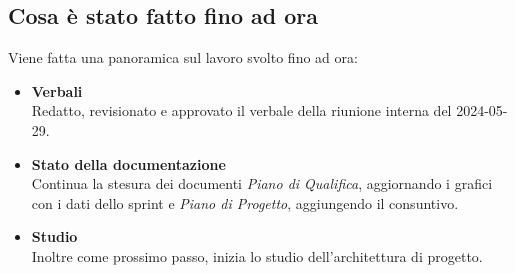 \documentclass[italian,12pt]{article}
\begin{document}
\subsection{Cosa è stato fatto fino ad ora}
Viene fatta una panoramica sul lavoro svolto fino ad ora:
\begin{itemize}
	\item \textbf{Verbali} \\
		  Redatto, revisionato e approvato il verbale della riunione interna del 2024-05-29.
	\item \textbf{Stato della documentazione} \\
		  Continua la stesura dei documenti \textit{Piano di Qualifica}, aggiornando i grafici con i dati dello sprint e \textit{Piano di Progetto}, aggiungendo il consuntivo.
	\item \textbf{Studio} \\
		  Inoltre come prossimo passo, inizia lo studio dell'architettura di progetto.
\end{itemize}
\end{document}
